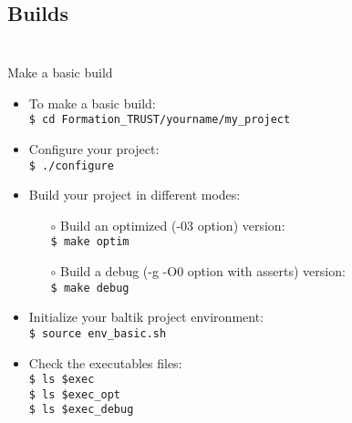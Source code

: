 \documentclass[10pt, hyperref={unicode=true,pdfusetitle, bookmarks=true,bookmarksnumbered=false,bookmarksopen=false, breaklinks=false,pdfborder={0 0 1},backref=true,colorlinks=true,linkcolor=darkblue,pageanchor, urlcolor=darkblue}]{beamer}
\begin{document}



\subsection{{\bf{Builds}}}
\begin{frame}
\begin{columns}[c] 
\tableofcontents[sections={1-4},currentsection, currentsubsection]
\tableofcontents[sections={5-8},currentsection, currentsubsection]
\end{columns}
\end{frame}
\begin{frame}
\frametitle{}
\begin{block}{Make a basic build}

\begin{itemize}
\item To make a basic build:\\
\texttt{\$ cd Formation\_TRUST/yourname/my\_project}

\item Configure your project:\\
\texttt{\$ ./configure}

\item Build your project in different modes:\\
    \begin{itemize}
    \item [$\circ$] Build an optimized (-03 option) version:\\
    \texttt{\$ make optim}
    \item [$\circ$] Build a debug (-g -O0 option with asserts) version:\\
    \texttt{\$ make debug}
    \end{itemize}

\item Initialize your baltik project environment:\\
\texttt{\$ source env\_basic.sh}\\

\item Check the executables files:\\
\texttt{\$ ls \$exec}\\
\texttt{\$ ls \$exec\_opt}\\
\texttt{\$ ls \$exec\_debug}\\

\end{itemize}

\end{block}
\end{frame}
\end{document}
